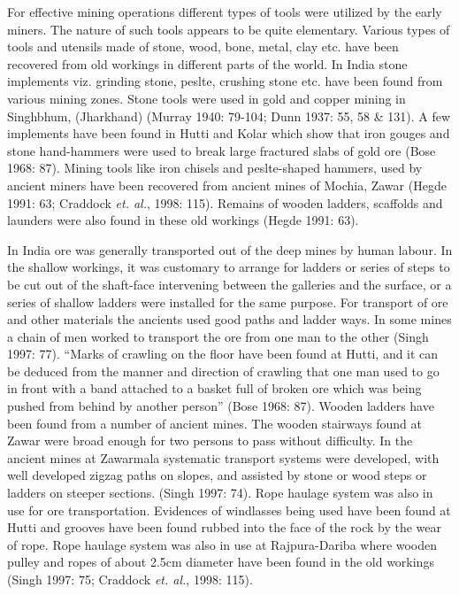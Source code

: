 \vspace{.1cm}


For effective mining operations different types of tools were utilized by the early miners. The nature of such tools appears to be quite elementary.  Various types of tools and utensils made of stone, wood, bone, metal, clay etc. have been recovered from old workings in different parts of the world. In India stone implements viz. grinding stone, peslte, crushing stone etc. have been found from various mining zones. Stone tools were used in gold and copper mining in Singhbhum, (Jharkhand) (Murray 1940: 79-104; Dunn 1937: 55, 58 \& 131). A few implements have been found in Hutti and Kolar which show that iron gouges and stone hand-hammers were used to break large fractured slabs of gold ore (Bose 1968: 87). Mining tools like iron chisels and peslte-shaped hammers, used by ancient miners have been recovered from ancient mines of Mochia, Zawar (Hegde 1991: 63; Craddock {\it et. al.}, 1998: 115). Remains of wooden ladders, scaffolds and launders were also found in these old workings (Hegde 1991: 63).  


\vspace{.1cm}


In India ore was generally transported out of the deep mines by human labour. In the shallow workings, it was customary to arrange for ladders or series of steps to be cut out of the shaft-face intervening between the galleries and the surface, or a series of shallow ladders were installed for the same purpose. For transport of ore and other materials the ancients used good paths and ladder ways. In some mines a chain of men worked to transport the ore from one man to the other (Singh 1997: 77). “Marks of crawling on the floor have been found at Hutti, and it can be deduced from the manner and direction of crawling that one man used to go in front with a band attached to a basket full of broken ore which was being pushed from behind by another person” (Bose 1968: 87). Wooden ladders have been found from a number of ancient mines. The wooden stairways found at Zawar were broad enough for two persons to pass without difficulty. In the ancient mines at Zawarmala systematic transport systems were developed, with well developed zigzag paths on slopes, and assisted by stone or wood steps or ladders on steeper sections. (Singh 1997: 74). Rope haulage system was also in use for ore transportation. Evidences of windlasses being used have been found at Hutti and grooves have been found rubbed into the face of the rock by the wear of rope. Rope haulage system was also in use at Rajpura-Dariba where wooden pulley and ropes of about 2.5cm diameter have been found in the old workings (Singh 1997: 75; Craddock {\it et. al.}, 1998: 115).

